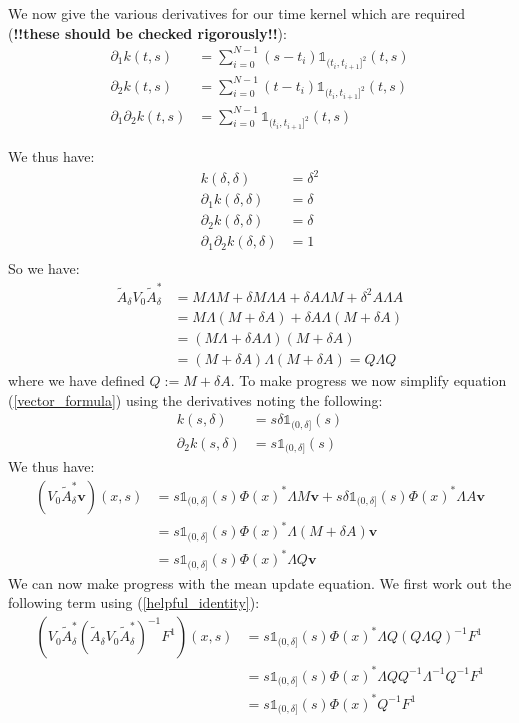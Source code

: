 \documentclass{article}
\theoremstyle{definition}
\theoremstyle{remark}
\theoremstyle{remark}
\begin{document}
\noindent We now give the various derivatives for our time kernel which are required (\textbf{!!these should be checked rigorously!!}):
\begin{align*}
    \partial_{1}k(t,s) &= \sum_{i=0}^{N-1}(s-t_{i})\mathbb{1}_{(t_{i},t_{i+1}]^{2}}(t,s) \\
    \partial_{2}k(t,s) &= \sum_{i=0}^{N-1}(t-t_{i})\mathbb{1}_{(t_{i},t_{i+1}]^{2}}(t,s) \\
    \partial_{1}\partial_{2}k(t,s) &= \sum_{i=0}^{N-1}\mathbb{1}_{(t_{i},t_{i+1}]^{2}}(t,s)
\end{align*}

\noindent We thus have:
\begin{align*}
    k(\delta,\delta) &= \delta^2 \\
    \partial_{1}k(\delta,\delta) &= \delta \\
    \partial_{2}k(\delta,\delta) &= \delta \\
    \partial_{1}\partial_{2}k(\delta,\delta) &= 1 \\
\end{align*}
So we have:
\begin{align*}
    \tilde{A}_{\delta}V_{0}\tilde{A}_{\delta}^{*} &= M\Lambda M + \delta M\Lambda A + \delta A\Lambda M +  \delta^{2}A\Lambda A \\
    &= M\Lambda(M+\delta A)+\delta A \Lambda(M+\delta A) \\
    &= (M\Lambda+\delta A \Lambda)(M+\delta A) \\
    &= (M+\delta A)\Lambda(M+\delta A) = Q\Lambda Q
\end{align*}
where we have defined $Q:=M+\delta A$. To make progress we now simplify equation (\ref{vector_formula}) using the derivatives noting the following:
\begin{align*}
    k(s,\delta) &= s\delta\mathbb{1}_{(0,\delta]}(s) \\
    \partial_{2}k(s,\delta) &= s\mathbb{1}_{(0,\delta]}(s)
\end{align*}
We thus have:
\begin{align}
    (V_{0}\tilde{A}_{\delta}^{*}\boldsymbol{v})(x,s) &= s\mathbb{1}_{(0,\delta]}(s)\Phi(x)^{*}\Lambda M\boldsymbol{v} + s\delta\mathbb{1}_{(0,\delta]}(s)\Phi(x)^{*}\Lambda A \boldsymbol{v} \nonumber \\
    &=s\mathbb{1}_{(0,\delta]}(s)\Phi(x)^{*}\Lambda(M+\delta A)\mathbf{v} \nonumber \\
    \label{helpful_identity}
    &=s\mathbb{1}_{(0,\delta]}(s)\Phi(x)^{*}\Lambda Q\mathbf{v}
\end{align}
We can now make progress with the mean update equation. We first work out the following term using (\ref{helpful_identity}):
\begin{align*}
    (V_{0}\tilde{A}_{\delta}^{*}(\tilde{A}_{\delta}V_{0}\tilde{A}_{\delta}^{*})^{-1}F^{1})(x,s) &= s\mathbb{1}_{(0,\delta]}(s)\Phi(x)^{*}\Lambda Q (Q\Lambda Q)^{-1}F^{1} \\
    &=s\mathbb{1}_{(0,\delta]}(s)\Phi(x)^{*}\Lambda Q Q^{-1}\Lambda^{-1}Q^{-1}F^{1} \\
    &=s\mathbb{1}_{(0,\delta]}(s)\Phi(x)^{*}Q^{-1}F^{1}
\end{align*}
\end{document}
